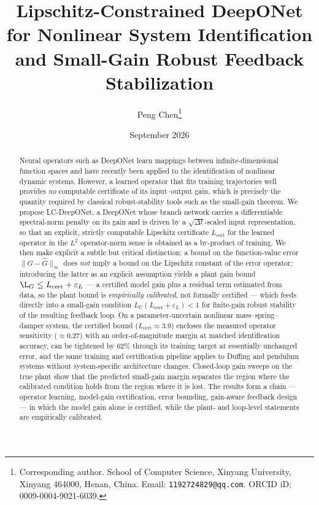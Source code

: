 \documentclass[11pt]{article}
\title{Lipschitz-Constrained DeepONet for Nonlinear System Identification\\
and Small-Gain Robust Feedback Stabilization}
\author{Peng Chen\thanks{Corresponding author. School of Computer Science,
Xinyang University, Xinyang 464000, Henan, China. Email:
\texttt{1192724829@qq.com}. ORCID iD: \mbox{0009-0004-9021-6039}.}}
\date{September 2026}
\newcommand{\Ltwo}{L^2}
\newcommand{\Ghat}{\hat{G}}
\newcommand{\Lhat}{L_{\mathrm{cert}}}
\newcommand{\epsL}{\varepsilon_L}
\newcommand{\LC}{L_{\mathrm{C}}}
\begin{document}
\maketitle

\begin{abstract}
Neural operators such as DeepONet learn mappings between infinite-dimensional
function spaces and have recently been applied to the identification of
nonlinear dynamic systems. However, a learned operator that fits training
trajectories well provides \emph{no} computable certificate of its input--output
gain, which is precisely the quantity required by classical robust-stability
tools such as the small-gain theorem. We propose LC-DeepONet, a DeepONet whose
branch network carries a differentiable spectral-norm penalty on its gain and is driven by a
$\sqrt{\Delta t}$-scaled input representation, so that an explicit, strictly
computable Lipschitz certificate $\Lhat$ for the learned operator in the
$\Ltwo$ operator-norm sense is obtained as a by-product of training. We then
make explicit a subtle but critical distinction: a bound on the function-value
error $\|G-\Ghat\|_\infty$ does \emph{not} imply a bound on the Lipschitz
constant of the error operator; introducing the latter as an explicit
assumption yields a plant gain bound $\L_G\le \Lhat+\epsL$ --- a certified
model gain plus a residual term estimated from data, so the plant bound is
\emph{empirically calibrated}, not formally certified --- which feeds directly into a small-gain condition
$\LC(\Lhat+\epsL)<1$ for finite-gain robust stability of the resulting
feedback loop. On a parameter-uncertain nonlinear mass--spring--damper
system, the certified bound ($\Lhat\approx3.9$) encloses the measured
operator sensitivity ($\approx0.27$) with an order-of-magnitude margin at
matched identification accuracy, can be tightened by $62\%$ through its
training target at essentially unchanged error, and the same training and
certification pipeline applies to Duffing and pendulum systems without
system-specific architecture changes. Closed-loop gain sweeps on the true
plant show that the predicted small-gain margin separates the region where
the calibrated condition holds from the region where it is lost. The results
form a chain --- operator learning, model-gain certification, error bounding,
gain-aware feedback design --- in which the model gain alone is certified,
while the plant- and loop-level statements are empirically calibrated.
\end{abstract}
\end{document}
